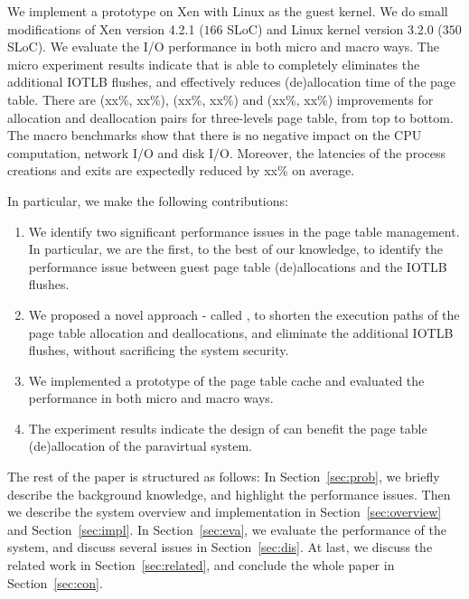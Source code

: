 We implement a prototype on Xen with Linux as the guest kernel. We do small modifications of Xen version 4.2.1 ($166$ SLoC) and Linux kernel version 3.2.0 ($350$ SLoC).
We evaluate the I/O performance in both micro and macro ways.
The micro experiment results indicate that \name is able to completely eliminates the additional IOTLB flushes, and effectively reduces (de)allocation time of the page table. 
There are (xx\%, xx\%), (xx\%, xx\%) and (xx\%, xx\%) improvements for allocation and deallocation pairs for three-levels page table, from top to bottom.
The macro benchmarks show that there is no negative impact on the CPU computation, network I/O and disk I/O. 
Moreover, the latencies of the process creations and exits are expectedly reduced by xx\% on average. 

In particular, we make the following contributions:
\begin{enumerate}
\item We identify two significant performance issues in the page table management. In particular, we are the first, to the best of our knowledge, to identify the performance issue between guest page table (de)allocations and the IOTLB flushes.
\item We proposed a novel approach - called \name, to shorten the execution paths of the page table allocation and deallocations, and eliminate the additional IOTLB flushes, without sacrificing the system security.
\item We implemented a prototype of the page table cache and evaluated the performance in both micro and macro ways.
\item The experiment results indicate the design of \name can benefit the page table (de)allocation of the paravirtual system.
\end{enumerate}

The rest of the paper is structured as follows: In Section~\ref{sec:prob}, we briefly describe the background knowledge, and highlight the performance issues. Then we describe the system overview and implementation in Section~\ref{sec:overview} and Section~\ref{sec:impl}. In Section~\ref{sec:eva}, we evaluate the performance of the \name system, and discuss several issues in Section~\ref{sec:dis}. At last, we discuss the related work in Section~\ref{sec:related}, and conclude the whole paper in Section~\ref{sec:con}.

